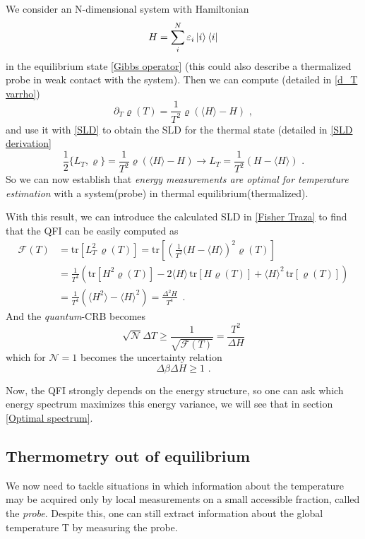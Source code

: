 We consider an N-dimensional system with Hamiltonian
\begin{equation}
     H = \sum_i^N \varepsilon_i\ket{i}\bra{i}
\end{equation}
in the equilibrium state \eqref{Gibbs operator} (this could also describe a thermalized probe in weak contact with the system). Then we can compute (detailed in \eqref{d_T varrho})
\begin{equation}
    \partial_T \varrho(T)=\frac{1}{T^2} \varrho(\langle  H \rangle - H)\,\, ,
\end{equation}
and use it with \eqref{SLD} to obtain the SLD for the thermal state (detailed in \eqref{SLD derivation}
\begin{equation}
    \frac{1}{2}\{{L}_T,\varrho\} =\frac{1}{T^2}\varrho(\langle H \rangle - H) \xrightarrow{} {L}_T = \frac{1}{T^2}( H - \langle  H \rangle)\,\,.
\end{equation}
So we can now establish that \emph{energy measurements are optimal for temperature estimation} with a system(probe) in thermal equilibrium(thermalized).

With this result, we can introduce the calculated SLD in \eqref{Fisher Traza} to find that the QFI can be easily computed as
\begin{align}
    \mathcal{F}(T)&=\text{tr}[L_T^2\,\varrho(T)]=\text{tr}\left[\left(\frac{1}{T^2}( H - \langle  H \rangle\right)^2 \varrho(T)\right]\\
    &=\frac{1}{T^4}\left(\text{tr}[ H ^2 \varrho(T)]-2\langle  H \rangle\,\text{tr}[ H \varrho(T)]+\langle  H \rangle^2\,\text{tr}[ \varrho(T)]\right)\\ \label{Fisher Gibbs}
    &=\frac{1}{T^4}\left(\langle H^2 \rangle-\langle  H \rangle^2 \right)= \frac{\Delta^2H}{T^4} \,\,\,.
\end{align}
And the \textit{quantum}-CRB becomes
\begin{equation}
    \sqrt{\mathcal{N}}\Delta T\geq\frac{1}{\sqrt{\mathcal{F}(T)}}=\frac{T^2}{\Delta H}
\end{equation}
which for $\mathcal{N}=1$ becomes the uncertainty relation 
\begin{equation}\label{Uncertainty BH}
\Delta \beta  \Delta H \geq 1 \,\,.
\end{equation}

Now, the QFI strongly depends on the energy structure, so one can ask which energy spectrum maximizes this energy variance, we will see that in section \ref{Optimal spectrum}.

\subsection{Thermometry out of equilibrium}
We now need to tackle situations in which information about the temperature may be acquired only by local measurements on a small accessible fraction, called the \textit{probe}. Despite this, one can still extract information about the global temperature T by measuring the probe.

